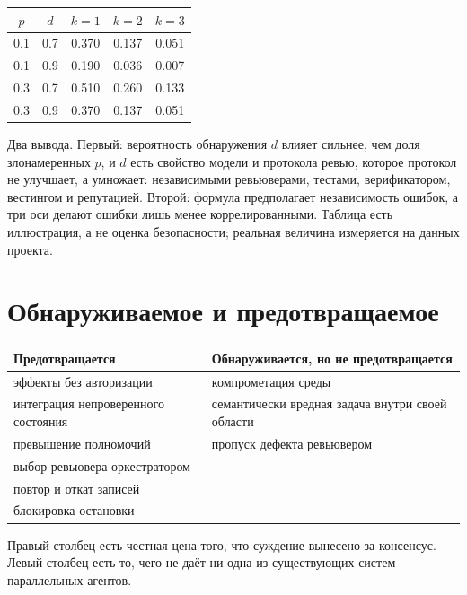 \begin{center}
\begin{tabular}{cc ccc}
\toprule
$p$ & $d$ & $k=1$ & $k=2$ & $k=3$ \\
\midrule
0.1 & 0.7 & 0.370 & 0.137 & 0.051 \\
0.1 & 0.9 & 0.190 & 0.036 & 0.007 \\
0.3 & 0.7 & 0.510 & 0.260 & 0.133 \\
0.3 & 0.9 & 0.370 & 0.137 & 0.051 \\
\bottomrule
\end{tabular}
\end{center}

Два вывода. Первый: вероятность обнаружения $d$ влияет сильнее, чем доля злонамеренных $p$, и $d$ есть свойство модели и протокола ревью, которое протокол не улучшает, а умножает: независимыми ревьюверами, тестами, верификатором, вестингом и репутацией. Второй: формула предполагает независимость ошибок, а три оси делают ошибки лишь менее коррелированными. Таблица есть иллюстрация, а не оценка безопасности; реальная величина измеряется на данных проекта.

\section{Обнаруживаемое и предотвращаемое}

\begin{center}
\small
\begin{tabular}{p{6.6cm} p{6.6cm}}
\toprule
Предотвращается & Обнаруживается, но не предотвращается \\
\midrule
эффекты без авторизации & компрометация среды \\
интеграция непроверенного состояния & семантически вредная задача внутри своей области \\
превышение полномочий & пропуск дефекта ревьювером \\
выбор ревьювера оркестратором & \\
повтор и откат записей & \\
блокировка остановки & \\
\bottomrule
\end{tabular}
\end{center}

Правый столбец есть честная цена того, что суждение вынесено за консенсус. Левый столбец есть то, чего не даёт ни одна из существующих систем параллельных агентов.
